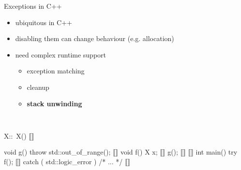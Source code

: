 \documentclass[aspectratio=169, fi]{paradise-slide}
\begin{document}
\newcommand{\arr}[1]{\visible<#1>{\textcolor{red}{$\mathbf{\longleftarrow}$}}}
\begin{frame}[fragile]{Exceptions in C++}
  \begin{minipage}{0.47\textwidth}
    \setlength{\leftmargini}{1em}
    \begin{itemize}
      \item ubiquitous in C++
      \item disabling them can change behaviour (e.g. allocation)
      \item need complex runtime support
        \begin{itemize}
          \item exception matching
          \item cleanup
          \item {\bf stack unwinding}
        \end{itemize}
    \end{itemize}

    \bigskip
    \medskip\\
  \end{minipage}
  \hfill
  \pause
  \begin{minipage}{0.47\textwidth}
    \begin{cppcodeln}
      X::~X() { } ⟦\arr{7}⟧

      void g() {
        throw std::out_of_range(); ⟦\arr{5}⟧
      }
      void f() {
        X x; ⟦\arr{3}⟧
        g(); ⟦\arr{4}⟧
      } ⟦\arr{6}⟧
      int main() {
        try {
          f(); ⟦\arr{2}⟧
        } catch ( std::logic_error ) {
          /* ... */ ⟦\arr{8}⟧
        }
      }
    \end{cppcodeln}
  \end{minipage}
\end{frame}
\end{document}
